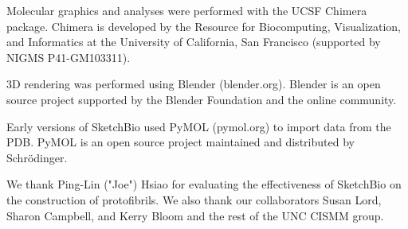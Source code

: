 \documentclass[twocolumn]{bmcart}%
\begin{document}
Molecular graphics and analyses were performed with the UCSF Chimera package.
Chimera is developed by the Resource for Biocomputing, Visualization, and Informatics at the University of California, San Francisco (supported by NIGMS P41-GM103311).

3D rendering was performed using Blender (blender.org).
Blender is an open source project supported by the Blender Foundation and the online community.

Early versions of SketchBio used PyMOL (pymol.org) to import data from the PDB.
PyMOL is an open source project maintained and distributed by Schrödinger.

We thank Ping-Lin ("Joe") Hsiao for evaluating the effectiveness of SketchBio on the construction of protofibrils. We also thank our collaborators Susan Lord, Sharon Campbell, and Kerry Bloom and the rest of the UNC CISMM group.

\end{document}
